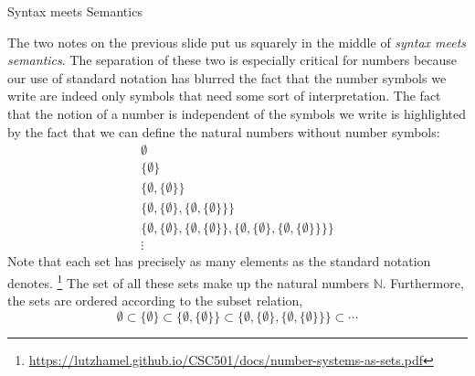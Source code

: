 \documentclass{beamer}
\begin{document}
\begin{frame}{Syntax meets Semantics}
\scriptsize

The two notes on the previous slide put us squarely in the middle of {\em syntax meets semantics}.  The separation
of these two is especially critical for numbers because our use of standard notation has blurred the fact that the number
symbols we write are indeed only symbols that need some sort of interpretation.  The fact that the notion of a number is
independent of the symbols we write is highlighted by the fact that we can define the natural numbers without number symbols:
\[
\begin{array}{l}
\emptyset \\
\{\emptyset \} \\
\{ \emptyset , \{\emptyset \} \}\\
\{ \emptyset , \{\emptyset \}, \{ \emptyset , \{\emptyset \} \} \}\\
\{ \emptyset , \{\emptyset \}, \{ \emptyset , \{\emptyset \} \} , \{ \emptyset , \{\emptyset \}, \{ \emptyset , \{\emptyset \} \} \}\}\\
\vdots
\end{array}
\]
Note that each set has precisely as many elements as the standard notation denotes.
\footnote{\tiny\url{https://lutzhamel.github.io/CSC501/docs/number-systems-as-sets.pdf}}
The set of all these sets make up the natural numbers $\mathbb{N}$.
Furthermore, the sets are ordered according to the subset relation,
\[
\emptyset \subset \{\emptyset \} \subset \{ \emptyset , \{\emptyset \} \} \subset \{ \emptyset , \{\emptyset \}, \{ \emptyset , \{\emptyset \} \} \} \subset \cdots
\]

\end{frame}

\end{document}
